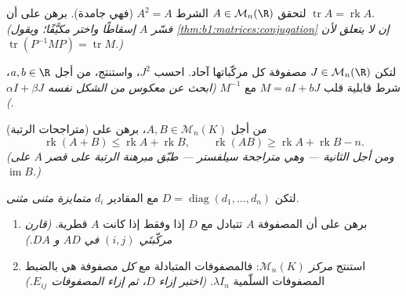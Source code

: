 \begin{exercise}[$\star\star$]\label{exo:b1:matrices:8}
لتحقق $A \in \mathcal{M}_n(\R)$ الشرط $A^2 = A$ (فهي جامدة). برهن
على أن $\operatorname{tr} A = \operatorname{rk} A$. \emph{(فسّر
$A$ إسقاطًا واختر  مكيَّفًا؛ ويقول
\cref{thm:b1:matrices:conjugation} إن 
لا يتعلق  لأن $\operatorname{tr}(P^{-1}MP) =
\operatorname{tr} M$.)}
\end{exercise}

\begin{exercise}[$\star\star\star$]\label{exo:b1:matrices:9}
لتكن $J \in \mathcal{M}_n(\R)$ مصفوفة كل مركّباتها آحاد. احسب $J^2$،
واستنتج، من أجل $a, b \in \R$، شرط قابلية قلب $M
= aI + bJ$ مع $M^{-1}$ \emph{(ابحث عن معكوس من
الشكل نفسه $\alpha I + \beta J$)}.
\end{exercise}

\begin{exercise}[$\star\star\star$]\label{exo:b1:matrices:10}
(متراجحات الرتبة) من أجل $A, B \in \mathcal{M}_n(K)$، برهن على
\[
\operatorname{rk}(A + B) \leq \operatorname{rk} A +
\operatorname{rk} B,
\qquad
\operatorname{rk}(AB) \geq \operatorname{rk} A + \operatorname{rk}
B - n .
\]
\emph{(ومن أجل الثانية --- وهي متراجحة سيلفستر --- طبّق
مبرهنة الرتبة على قصر  $A$ على
$\operatorname{im} B$.)}
\end{exercise}

\begin{exercise}[$\star\star$]\label{exo:b1:matrices:11}
لتكن $D = \operatorname{diag}(d_1, \dots, d_n)$ مع المقادير $d_i$
\emph{متمايزة مثنى مثنى}.
\begin{enumerate}
  \item برهن على أن المصفوفة $A$ تتبادل مع $D$ إذا وفقط إذا كانت
        $A$ قطرية. \emph{(قارن مركّبتَي $(i,j)$ في
        $AD$ و $DA$.)}
  \item استنتج \emph{مركز} $\mathcal{M}_n(K)$: فالمصفوفات
        المتبادلة مع \emph{كل} مصفوفة هي بالضبط
        المصفوفات السلّمية $\lambda I_n$. \emph{(اختبر إزاء
        $D$، ثم إزاء المصفوفات $E_{ij}$.)}
\end{enumerate}
\end{exercise}

